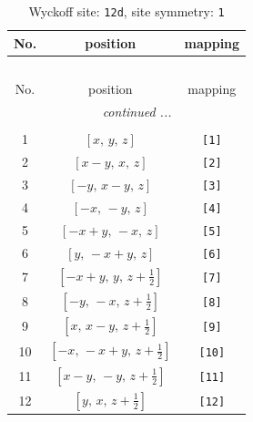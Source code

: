 \documentclass[fleqn,8pt]{jsarticle}
\begin{document}
\begin{longtable}{ccc}
\caption{Wyckoff site: {\tt 12d}, site symmetry: {\tt 1}}
 \\
 \hline \hline
No. & position & mapping \\ \hline \endfirsthead

\multicolumn{2}{l}{\tablename\ \thetable{}} \\
 \hline \hline
No. & position & mapping \\ \hline \endhead

 \hline \hline
\multicolumn{2}{r}{\footnotesize\it continued ...} \\ \endfoot

 \hline \hline
\multicolumn{2}{r}{} \\ \endlastfoot

1 & $\left[ x,\, y,\, z \right]$ & {\tt [1]} \\ \hline
2 & $\left[ x - y,\, x,\, z \right]$ & {\tt [2]} \\ \hline
3 & $\left[ - y,\, x - y,\, z \right]$ & {\tt [3]} \\ \hline
4 & $\left[ - x,\, - y,\, z \right]$ & {\tt [4]} \\ \hline
5 & $\left[ - x + y,\, - x,\, z \right]$ & {\tt [5]} \\ \hline
6 & $\left[ y,\, - x + y,\, z \right]$ & {\tt [6]} \\ \hline
7 & $\left[ - x + y,\, y,\, z + \frac{1}{2} \right]$ & {\tt [7]} \\ \hline
8 & $\left[ - y,\, - x,\, z + \frac{1}{2} \right]$ & {\tt [8]} \\ \hline
9 & $\left[ x,\, x - y,\, z + \frac{1}{2} \right]$ & {\tt [9]} \\ \hline
10 & $\left[ - x,\, - x + y,\, z + \frac{1}{2} \right]$ & {\tt [10]} \\ \hline
11 & $\left[ x - y,\, - y,\, z + \frac{1}{2} \right]$ & {\tt [11]} \\ \hline
12 & $\left[ y,\, x,\, z + \frac{1}{2} \right]$ & {\tt [12]} \\
\end{longtable}
\end{document}
